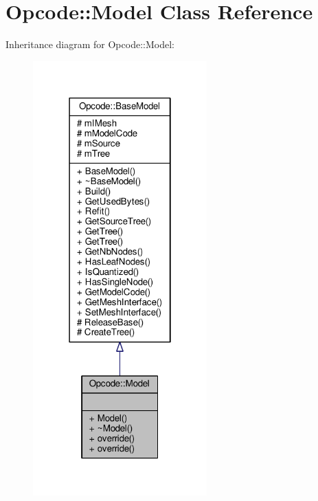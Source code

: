 \hypertarget{classOpcode_1_1Model}{}\section{Opcode\+:\+:Model Class Reference}
\label{classOpcode_1_1Model}


Inheritance diagram for Opcode\+:\+:Model\+:
\nopagebreak
\begin{figure}[H]
\begin{center}
\leavevmode
\includegraphics[width=190pt]{dd/d9f/classOpcode_1_1Model__inherit__graph}
\end{center}
\end{figure}


